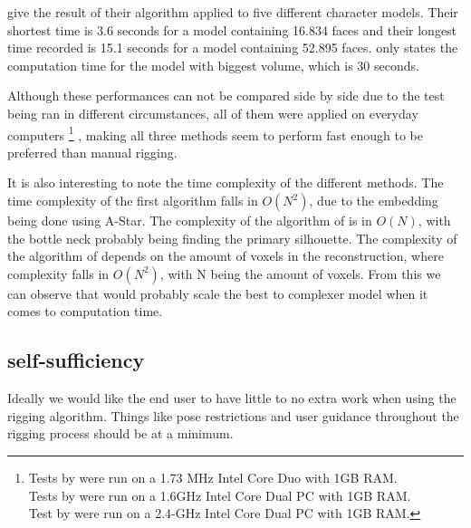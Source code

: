 \documentclass{article}
\begin{document}
\citep{paper2} give the result of their algorithm applied to five different
character models. Their shortest time is 3.6 seconds for a model containing
16.834 faces and their longest time recorded is 15.1 seconds for a model
containing 52.895 faces.
\citep{paper3} only states the computation time for the model with biggest
volume, which is 30 seconds.

Although these performances can not be compared side by side due to the test
being ran in different circumstances, all of them were applied on everyday
computers \footnote{Tests by \citep{paper1} were run on a 1.73 MHz Intel Core Duo
    with 1GB RAM.\\ Tests by \citep{paper2} were run on a 1.6GHz Intel Core Dual PC
    with 1GB RAM.\\
Test by \citep{paper3} were run on a 2.4-GHz Intel Core Dual PC with 1GB RAM.}
, making all three methods seem to perform fast enough to be preferred than
manual rigging. 

It is also interesting to note the time complexity of the different methods.
The time complexity of the first algorithm falls in $O(N^2)$, due to the
embedding being done using A-Star.
The complexity of the algorithm of \citep{paper2} is in $O(N)$, with the bottle
neck probably being finding the primary silhouette.
The complexity of the algorithm of \citep{paper3} depends on the amount of
voxels in the reconstruction, where complexity falls in $O(N^2)$, with N being the
amount of voxels.
From this we can observe that \citep{paper2} would probably scale the best to
complexer model when it comes to computation time.

\subsection{self-sufficiency}
Ideally we would like the end user to have little
to no extra work when using the rigging algorithm. Things like pose restrictions
and user guidance throughout the rigging process should be at a minimum.
\end{document}
